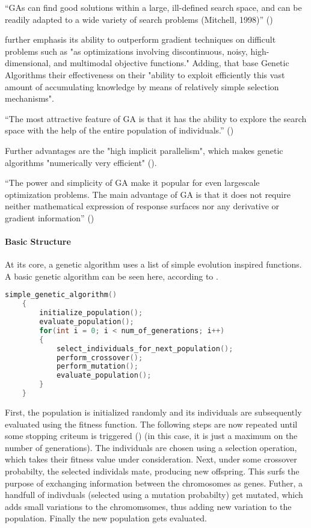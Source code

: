 \enquote{GAs can find good solutions within a large, ill-defined search space, and can be readily adapted to a wide variety of search problems (Mitchell, 1998)} (\cite{mills_determining_2015})

\cite{grefenstette_optimization_1986} further emphasis its ability to outperform gradient techniques on difficult problems such as "as optimizations involving discontinuous, noisy, high-dimensional, and multimodal objective functions." Adding, that base Genetic Algorithms their effectiveness on their "ability to exploit efficiently this vast amount of accumulating knowledge by means of relatively simple selection mechanisms".

\enquote{The most attractive feature of GA is that it has the ability to explore the search space with the help of the entire population of individuals.} (\cite{hussain_trade-off_2020})


Further advantages are the "high implicit parallelism", which makes genetic algorithms "numerically very efficient" (\cite{marsili_libelli_adaptive_2000}).

\enquote{The power and simplicity of GA make it popular for even largescale optimization problems. The main advantage of GA is that it does not require neither mathematical expression of response surfaces nor any derivative or gradient information} (\cite{boyabatli_parameter_2004})


\paragraph{Basic Structure}
At its core, a genetic algorithm uses a list of simple evolution inspired functions. A basic genetic algorithm can be seen here, according to \cite{srinivas_genetic_1994}. 

\begin{lstlisting}[language=C, tabsize=4]
	simple_genetic_algorithm() 
	{
		initialize_population();
		evaluate_population();
		for(int i = 0; i < num_of_generations; i++) 
		{
			select_individuals_for_next_population();
			perform_crossover();
			perform_mutation();
			evaluate_population();
		}
	}
\end{lstlisting}


First, the population is initialized randomly and its individuals are subsequently evaluated using the fitness function. The following steps are now repeated until some stopping criteum is triggered (\cite{grefenstette_optimization_1986}) (in this case, it is just a maximum on the number of generations).
The individuals are chosen using a selection operation, which takes their fitness value under consideration. Next, under some crossover probabilty, the selected individals mate, producing new offspring. This surfs the purpose of exchanging information between the chromosomes as genes. Futher, a handfull of indivduals (selected using a mutation probabilty) get mutated, which adds small variations to the chromomsomes, thus adding new variation to the population.
Finally the new population gets evaluated.


